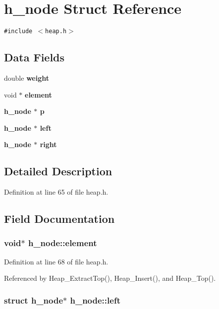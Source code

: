 \section{h\_\-node Struct Reference}
\label{structh__node}
{\tt \#include $<$heap.h$>$}

\subsection*{Data Fields}
\begin{CompactItemize}
\item 
double \bf{weight}
\item 
void $\ast$ \bf{element}
\item 
\bf{h\_\-node} $\ast$ \bf{p}
\item 
\bf{h\_\-node} $\ast$ \bf{left}
\item 
\bf{h\_\-node} $\ast$ \bf{right}
\end{CompactItemize}


\subsection{Detailed Description}




Definition at line 65 of file heap.h.

\subsection{Field Documentation}
\subsubsection{\setlength{\rightskip}{0pt plus 5cm}void$\ast$ \bf{h\_\-node::element}}\label{structh__node_1e737fb9ca27bfc870d6c90eb3237aaf}




Definition at line 68 of file heap.h.

Referenced by Heap\_\-Extract\-Top(), Heap\_\-Insert(), and Heap\_\-Top().
\subsubsection{\setlength{\rightskip}{0pt plus 5cm}struct \bf{h\_\-node}$\ast$ \bf{h\_\-node::left}}\label{structh__node_6e5495717e3db96836b2a28f18183b78}




